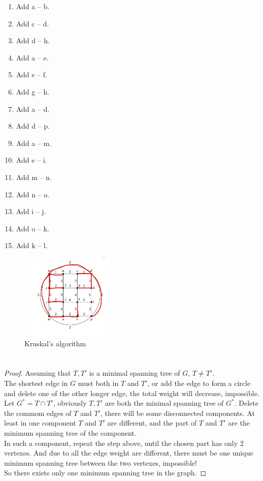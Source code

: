 \documentclass{article}
\begin{document}
\begin{enumerate}
    \item Add a -- b.
    \item Add c -- d.
    \item Add d -- h.
    \item Add a -- e.
    \item Add e -- f.
    \item Add g -- h.
    \item Add a -- d.
    \item Add d -- p.
    \item Add a -- m.
    \item Add e -- i.
    \item Add m -- n.
    \item Add n -- o.
    \item Add i -- j.
    \item Add o -- k.
    \item Add k -- l.
\end{enumerate}

\begin{figure}[htbp]
    \centering
    \includegraphics[width=0.4\textwidth]{屏幕截图 2024-12-22 104129.png}
    \caption{Kruskal's algorithm}
\end{figure}

\section{}

\begin{proof}
    Assuming that $T, T'$ is a minimal spanning tree of $G$, $T \neq T'$.\\
    The shortest edge in $G$ must both in $T$ and $T'$, or add the edge to form a circle and delete one of the other longer edge, the total weight will decrease, impossible. \\
    Let $G^* = T \cap T'$, obviously $T, T'$ are both the minimal spanning tree of $G^*$. Delete the commom edges of $T$ and $T'$, there will be some disconnected components. At least in one component $T$ and $T'$ are different, and the part of $T$ and $T'$ are the minimum spanning tree of the component. \\
    In such a component, repeat the step above, until the chosen part has only 2 vertexes. And due to all the edge weight are different, there must be one unique minimum spanning tree between the two vertexes, impossible! \\
    So there exists only one minimum spanning tree in the graph.
\end{proof}
\end{document}
